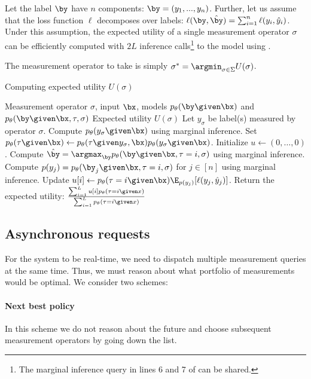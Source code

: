 Let the label $\by$ have $n$ components: $\by = (y_1, ..., y_n)$.
Further, let us assume that the loss function $\ell$ decomposes over labels: $\ell(\by, \byt) = \sum_{i=1}^n \ell(y_i, \yt_i)$. 
Under this assumption, the expected utility of a single measurement operator $\sigma$ can be efficiently computed with $2L$ inference calls\footnote{The marginal inference query in lines 6 and 7 of  can be shared.} to the model using .

The measurement operator to take is simply $\sigma^* = \argmin_{\sigma \in \Sigma} U(\sigma)$.

\begin{algorithm}
  \label{algo:expected-utility}
\renewcommand{\algorithmicrequire}{\textbf{Input:}}
\renewcommand{\algorithmicensure}{\textbf{Output:}}
  \caption{Computing expected utility $U(\sigma)$}
  \begin{algorithmic}[1]
    \REQUIRE Measurement operator $\sigma$, input $\bx$, models $p_\theta(\by \given \bx)$ and $p_\theta(\by \given \bx, \tau, \sigma)$
    \ENSURE Expected utility $U(\sigma)$
    \STATE Let $y_\sigma$ be label(s) measured by operator $\sigma$.
    \STATE Compute $p_\theta(y_\sigma \given \bx)$ using marginal inference.
    \STATE Set $p_\theta(\tau \given \bx) \gets p_\theta(\tau \given y_\sigma, \bx) p_\theta(y_\sigma \given \bx)$.
    \STATE Initialize $u \gets (0, \dots, 0)$.
    \STATE Compute $\byt = \argmax_{\by} p_\theta(\by \given \bx, \tau = i, \sigma)$ using marginal inference.
    \STATE Compute $p(y_j) = p_\theta(\by_j \given \bx, \tau = i, \sigma)$ for $j \in [n]$ using marginal inference.
    \STATE Update $u[i] \gets p_\theta(\tau = i \given \bx) \E_{p(y_j)}[\ell(y_j, \yt_j)]$.
    \ENDFOR
    \STATE Return the expected utility: $\frac{\sum_{i=1}^L u[i] p_\theta(\tau = i \given x)}{\sum_{i=1}^L p_\theta(\tau = i \given x)}$
  \end{algorithmic}
\end{algorithm}

\subsection{Asynchronous requests}

For the system to be real-time, we need to dispatch multiple measurement queries at the same time.
Thus, we must reason about what portfolio of measurements would be optimal.
We consider two schemes:

\paragraph{Next best policy}
In this scheme we do not reason about the future and choose subsequent measurement operators by going down the list.

